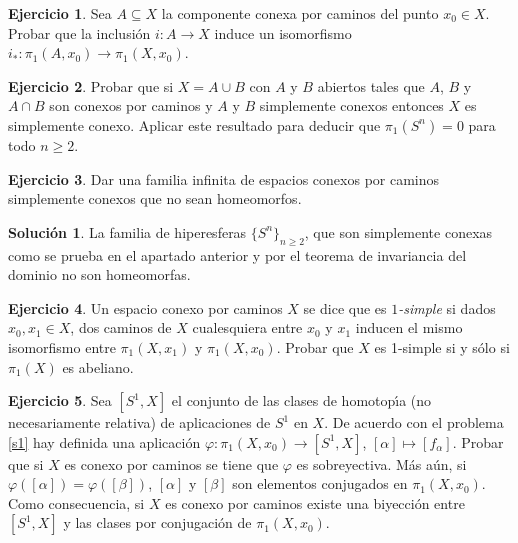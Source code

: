 \documentclass{article}
\theoremstyle{plain}
\theoremstyle{definition}
\newtheorem{exercise}{Ejercicio}
\newtheorem*{sol*}{Solución}
\begin{document}
\newpage \begin{exercise} Sea $A\subseteq X$ la componente conexa por caminos del punto $x_0\in X$. Probar que la inclusi\'on
$i: A\to X$ induce un isomorfismo $i_*: \pi_1(A,x_0) \to \pi_1(X,x_0)$.
\end{exercise}

\newpage 

\begin{exercise}
Probar que si $X = A\cup B$ con $A$ y $B$ abiertos tales que $A$, $B$ y $A\cap B$ son conexos por caminos
 y $A$ y $B$ simplemente conexos entonces  $X$ es simplemente conexo. Aplicar este resultado para deducir
 que $\pi_1(S^n) = 0$ para todo $n \geq 2$.
\end{exercise}
\newpage 
\begin{exercise}
Dar una familia infinita de espacios conexos por caminos simplemente conexos que no sean homeomorfos.
\end{exercise}
\begin{sol*}
La familia de hiperesferas $\{S^n\}_{n\geq 2}$, que son simplemente conexas como se prueba en el apartado anterior y por el teorema de invariancia del dominio no son homeomorfas. 
\end{sol*}

\vspace{0.1cm}

\newpage \begin{exercise} Un espacio conexo por caminos $X$ se dice que es {\it $1$-simple} si
dados $x_0, x_1\in X$, dos caminos de $X$ cualesquiera entre $x_0$ y $x_1$ inducen el mismo
isomorfismo entre $\pi_1(X,x_1)$ y $\pi_1(X,x_0)$.
Probar que $X$ es 1-simple si y s\'olo si $\pi_1(X)$ es abeliano.
\end{exercise}

\newpage 
\begin{exercise}
Sea $[S^1,X]$ el conjunto de las clases de homotop\'{\i}a (no necesariamente relativa) de aplicaciones de $S^1$ en $X$. De acuerdo con el problema \ref{s1} hay definida una aplicaci\'on $\varphi: \pi_1(X,x_0) \to [S^1,X]$, $[\alpha] \mapsto [f_{\alpha}]$. Probar que si $X$ es conexo por caminos se tiene que $\varphi$ es sobreyectiva. M\'as a\'un, si $\varphi ([\alpha]) = \varphi([\beta])$, $[\alpha]$ y $[\beta]$ son elementos conjugados en $\pi_1(X,x_0)$.
Como consecuencia, si $X$ es conexo por caminos existe una biyecci\'on entre $[S^1,X]$ y las clases por conjugaci\'on de $\pi_1(X,x_0)$.
\end{exercise}
\end{document}
